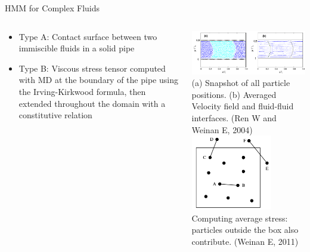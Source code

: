 \documentclass{beamer}
\begin{document}
	\begin{frame}{HMM for Complex Fluids}
		\begin{columns}[T]
			\begin{column}{0.5\textwidth}
				\begin{itemize}
					\vspace{-0.5em}
					\item Type A: Contact surface between two immiscible fluids in a solid pipe\vspace{5em}
					\item Type B: Viscous stress tensor computed with MD at the boundary of the pipe using the Irving-Kirkwood formula, then extended throughout the domain with a constitutive relation
				\end{itemize}
			\end{column}
			\begin{column}{0.6\textwidth}
				\vspace{-0.5em}
				\includegraphics[width=1\textwidth]{weinan1.png}
				\\\tiny (a) Snapshot of all particle positions. (b) Averaged Velocity field and fluid-fluid interfaces. (Ren W and Weinan E, 2004)\\
				\vspace{0.25em}\hspace{1.1cm}\includegraphics[width=0.7\textwidth]{weinan2.png}
				\\\tiny Computing average stress: particles outside the box also contribute. (Weinan E, 2011)\\
			\end{column}
		\end{columns}
	\end{frame}
	
\end{document}
